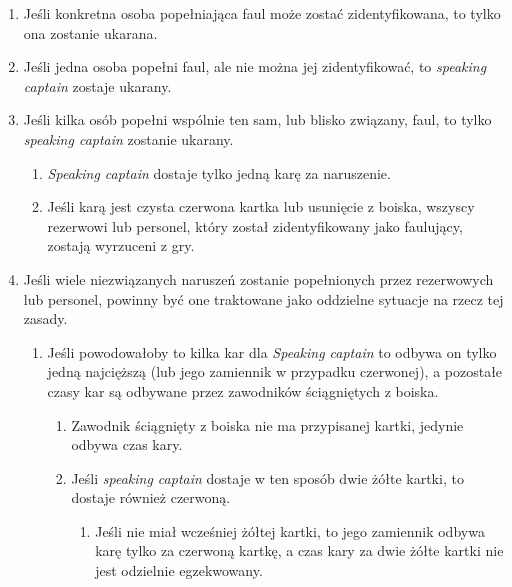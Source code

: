 \documentclass[11pt,a4paper]{article}
\renewcommand{\subsection}[1]{
  \oldsubsection{#1}%
  \label{\thesubsection}
}
\begin{document}
\begin{enumerate}
  \item Jeśli konkretna osoba popełniająca faul może zostać zidentyfikowana, to tylko ona zostanie ukarana.
  \item Jeśli jedna osoba popełni faul, ale nie można jej zidentyfikować, to \emph{speaking captain} zostaje ukarany.
  \item Jeśli kilka osób popełni wspólnie ten sam, lub blisko związany, faul, to tylko \emph{speaking captain} zostanie ukarany.
  \begin{enumerate}
    \item \emph{Speaking captain} dostaje tylko jedną karę za naruszenie.
    \item Jeśli karą jest czysta czerwona kartka lub usunięcie z boiska, wszyscy rezerwowi lub personel, który został zidentyfikowany jako faulujący, zostają wyrzuceni z gry.
  \end{enumerate}
  \item Jeśli wiele niezwiązanych naruszeń zostanie popełnionych przez rezerwowych lub personel, powinny być one traktowane jako oddzielne sytuacje na rzecz tej zasady.
  \begin{enumerate}
    \item Jeśli powodowałoby to kilka kar dla \emph{Speaking captain} to odbywa on tylko jedną najcięższą (lub jego zamiennik w przypadku czerwonej), a pozostałe czasy kar są odbywane przez zawodników ściągniętych z boiska.
    \begin{enumerate}
      \item Zawodnik ściągnięty z boiska nie ma przypisanej kartki, jedynie odbywa czas kary.
      \item Jeśli \emph{speaking captain} dostaje w ten sposób dwie żółte kartki, to dostaje również czerwoną.
      \begin{enumerate}
        \item Jeśli nie miał wcześniej żółtej kartki, to jego zamiennik odbywa karę tylko za czerwoną kartkę, a czas kary za dwie żółte kartki nie jest odzielnie egzekwowany.
      \end{enumerate}
    \end{enumerate}
  \end{enumerate}
\end{enumerate}

\subsection{Moment faulu}
\end{document}
